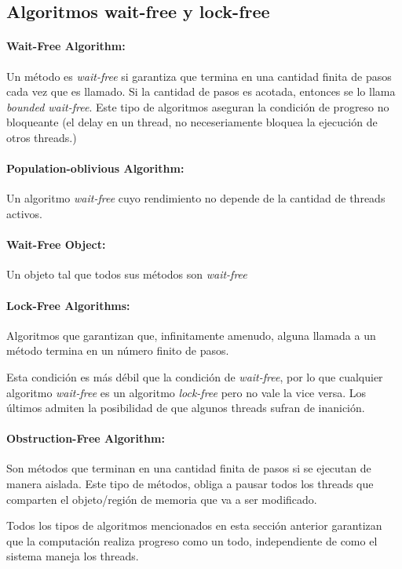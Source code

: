 \subsection{Algoritmos wait-free y lock-free}
\paragraph{Wait-Free Algorithm:} Un método es \textit{wait-free} si garantiza que termina en una cantidad finita de pasos cada vez que es llamado. Si la cantidad de pasos es acotada, entonces se lo llama \textit{bounded wait-free}. Este tipo de algoritmos aseguran la condición de progreso no bloqueante (el delay en un thread, no neceseriamente bloquea la ejecución de otros threads.)

\paragraph{Population-oblivious Algorithm:} Un algoritmo \textit{wait-free} cuyo rendimiento no depende de la cantidad de threads activos.

\paragraph{Wait-Free Object:} Un objeto tal que todos sus métodos son \textit{wait-free}

\paragraph{Lock-Free Algorithms:} Algoritmos que garantizan que, infinitamente amenudo, alguna llamada a un método termina en un número finito de pasos. 

Esta condición es más débil que la condición de \textit{wait-free}, por lo que cualquier algoritmo \textit{wait-free} es un algoritmo \textit{lock-free} pero no vale la vice versa. Los últimos admiten la posibilidad de que algunos threads sufran de inanición.

\paragraph{Obstruction-Free Algorithm:} Son métodos que terminan en una cantidad finita de pasos si se ejecutan de manera aislada. Este tipo de métodos, obliga a pausar todos los threads que comparten el objeto/región de memoria que va a ser modificado.

\vspace*{0.5cm}
Todos los tipos de algoritmos mencionados en esta sección anterior garantizan que la computación realiza progreso como un todo, independiente de como el sistema maneja los threads.

